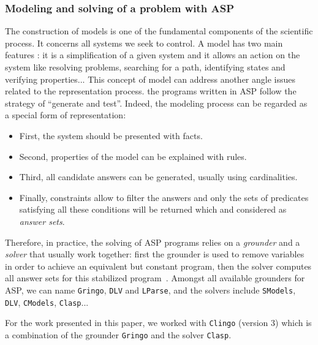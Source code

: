 \subsubsection{Modeling and solving of a problem with ASP}

The construction of models is one of the fundamental components of the scientific process.
It concerns all systems we seek to control.
A model has two main features \cite{Glimpse}:
it is a simplification of a given system
and it allows an action on the system like resolving problems, searching for a path, identifying states and verifying properties...
This concept of model can address another angle issues related to the representation process.
the programs written in ASP follow the strategy of “generate and test”.
Indeed, the modeling process can be regarded as a special form of representation:
\begin{itemize}
  \item First, the system should be presented with facts.
  \item Second, properties of the model can be explained with rules.
  \item Third, all candidate answers can be generated, usually using cardinalities.
  \item Finally, constraints allow to filter the answers and only the sets of predicates satisfying all these conditions will be returned which and considered as \emph{answer sets}.
\end{itemize}

Therefore, in practice, the solving of ASP programs relies on a \emph{grounder} and a \emph{solver}
that usually work together:
first the grounder is used to remove variables in order to achieve an equivalent but constant program,
then the solver computes all answer sets for this stabilized program~\cite{Vladimir,AnsPrologAPE}.
Amongst all available grounders for ASP, we can name
\texttt{Gringo}, \texttt{DLV} and \texttt{LParse},
and the solvers include
\texttt{SModels}, \texttt{DLV}, \texttt{CModels}, \texttt{Clasp}...

For the work presented in this paper, we worked with \texttt{Clingo} (version 3) which is a combination of the grounder \texttt{Gringo} and the solver \texttt{Clasp}.

